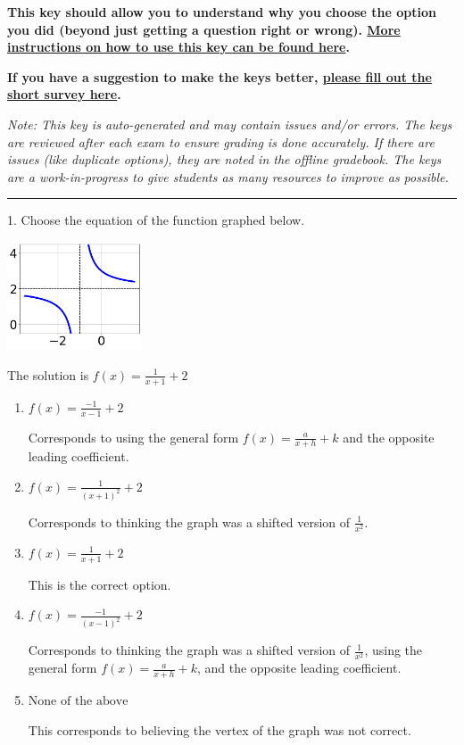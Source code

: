 \documentclass{extbook}[14pt]
\begin{document}
\textbf{This key should allow you to understand why you choose the option you did (beyond just getting a question right or wrong). \href{https://xronos.clas.ufl.edu/mac1105spring2020/courseDescriptionAndMisc/Exams/LearningFromResults}{More instructions on how to use this key can be found here}.}

\textbf{If you have a suggestion to make the keys better, \href{https://forms.gle/CZkbZmPbC9XALEE88}{please fill out the short survey here}.}

\textit{Note: This key is auto-generated and may contain issues and/or errors. The keys are reviewed after each exam to ensure grading is done accurately. If there are issues (like duplicate options), they are noted in the offline gradebook. The keys are a work-in-progress to give students as many resources to improve as possible.}

\rule{\textwidth}{0.4pt}

1. Choose the equation of the function graphed below.
\begin{center} \includegraphics[width=0.3\textwidth]{../Figures/rationalGraphToEquationB.png} \end{center} 

The solution is $ f(x) = \frac{1}{x + 1} + 2 $ 

\begin{enumerate}[label=\Alph*.] 
\item $ f(x) = \frac{-1}{x - 1} + 2 $ 

 Corresponds to using the general form $f(x) = \frac{a}{x+h}+k$ and the opposite leading coefficient. 
\item $ f(x) = \frac{1}{(x + 1)^2} + 2 $ 

 Corresponds to thinking the graph was a shifted version of $\frac{1}{x^2}$. 
\item $ f(x) = \frac{1}{x + 1} + 2 $ 

 This is the correct option. 
\item $ f(x) = \frac{-1}{(x - 1)^2} + 2 $ 

 Corresponds to thinking the graph was a shifted version of $\frac{1}{x^2}$, using the general form $f(x) = \frac{a}{x+h}+k$, and the opposite leading coefficient. 
\item $ \text{None of the above} $ 

 This corresponds to believing the vertex of the graph was not correct. 
\end{enumerate} 
 
\end{document}
